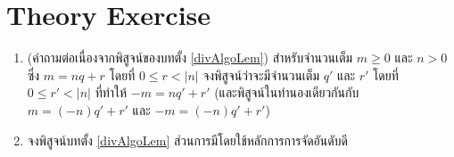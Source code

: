 \section{Theory Exercise}
\begin{enumerate}
	\item\label{quoRemExis} (คำถามต่อเนื่องจากพิสูจน์ของบทตั้ง \ref{divAlgoLem}) สำหรับจำนวนเต็ม $m\geq 0$ และ $n>0$ ซึ่ง $m = nq + r$ โดยที่ $0\leq r < |n|$ จงพิสูจน์ว่าจะมีจำนวนเต็ม $q'$ และ $r'$ โดยที่ $0\leq r' < |n|$ ที่ทำให้ $-m = nq' + r'$ (และพิสูจน์ในทำนองเดียวกันกับ $m = (-n)q' + r'$ และ $-m = (-n)q' + r'$)
	
	\item จงพิสูจน์บทตั้ง \ref{divAlgoLem} ส่วนการมีโดยใช้หลักการการจัดอันดับดี 
\end{enumerate}